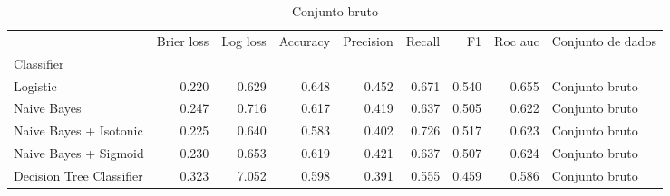 \begin{table}
\centering
\caption{Conjunto bruto}
\label{Conjunto bruto 0}
\begin{tabular}{lrrrrrrrl}
\toprule
{} &  Brier  loss &  Log loss &  Accuracy  &  Precision  &  Recall  &    F1  &  Roc auc  & Conjunto de dados \\
Classifier               &              &           &            &             &          &        &           &                   \\
\midrule
Logistic                 &        0.220 &     0.629 &      0.648 &       0.452 &    0.671 &  0.540 &     0.655 &    Conjunto bruto \\
Naive Bayes              &        0.247 &     0.716 &      0.617 &       0.419 &    0.637 &  0.505 &     0.622 &    Conjunto bruto \\
Naive Bayes + Isotonic   &        0.225 &     0.640 &      0.583 &       0.402 &    0.726 &  0.517 &     0.623 &    Conjunto bruto \\
Naive Bayes + Sigmoid    &        0.230 &     0.653 &      0.619 &       0.421 &    0.637 &  0.507 &     0.624 &    Conjunto bruto \\
Decision Tree Classifier &        0.323 &     7.052 &      0.598 &       0.391 &    0.555 &  0.459 &     0.586 &    Conjunto bruto \\
\bottomrule
\end{tabular}
\end{table}
